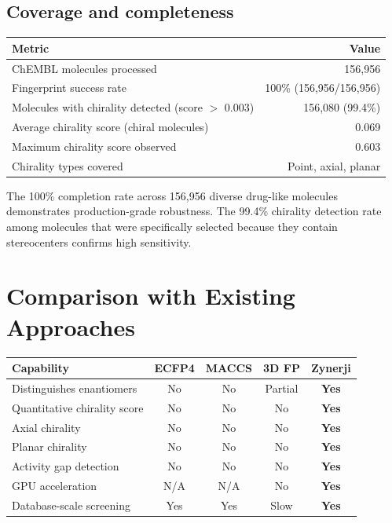 \documentclass[11pt,a4paper]{article}
\begin{document}
\subsection{Coverage and completeness}

\begin{center}
\begin{tabular}{lr}
\toprule
\textbf{Metric} & \textbf{Value} \\
\midrule
ChEMBL molecules processed & 156,956 \\
Fingerprint success rate & 100\% (156,956/156,956) \\
Molecules with chirality detected (score $>$ 0.003) & 156,080 (99.4\%) \\
Average chirality score (chiral molecules) & 0.069 \\
Maximum chirality score observed & 0.603 \\
Chirality types covered & Point, axial, planar \\
\bottomrule
\end{tabular}
\end{center}

The 100\% completion rate across 156,956 diverse drug-like molecules
demonstrates production-grade robustness. The 99.4\% chirality detection rate
among molecules that were specifically selected because they contain
stereocenters confirms high sensitivity.

\newpage

\section{Comparison with Existing Approaches}

\begin{center}
\begin{tabularx}{\textwidth}{lcccc}
\toprule
\textbf{Capability} & \textbf{ECFP4} & \textbf{MACCS} & \textbf{3D FP} & \textbf{Zynerji} \\
\midrule
Distinguishes enantiomers & No & No & Partial & \textbf{Yes} \\
Quantitative chirality score & No & No & No & \textbf{Yes} \\
Axial chirality & No & No & No & \textbf{Yes} \\
Planar chirality & No & No & No & \textbf{Yes} \\
Activity gap detection & No & No & No & \textbf{Yes} \\
GPU acceleration & N/A & N/A & No & \textbf{Yes} \\
Database-scale screening & Yes & Yes & Slow & \textbf{Yes} \\
\bottomrule
\end{tabularx}
\end{center}
\end{document}
